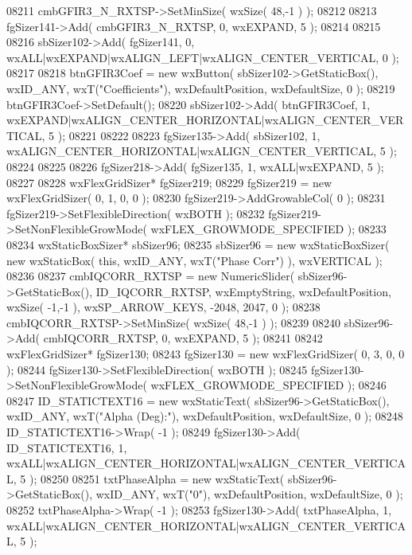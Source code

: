 \begin{DoxyCode}
08211     cmbGFIR3_N_RXTSP->SetMinSize( wxSize( 48,-1 ) );
08212     
08213     fgSizer141->Add( cmbGFIR3_N_RXTSP, 0, wxEXPAND, 5 );
08214     
08215     
08216     sbSizer102->Add( fgSizer141, 0, wxALL|wxEXPAND|wxALIGN\_LEFT|wxALIGN\_CENTER\_VERTICAL, 0 );
08217     
08218     btnGFIR3Coef = \textcolor{keyword}{new} wxButton( sbSizer102->GetStaticBox(), wxID\_ANY, wxT(\textcolor{stringliteral}{"Coefficients"}), 
      wxDefaultPosition, wxDefaultSize, 0 );
08219     btnGFIR3Coef->SetDefault(); 
08220     sbSizer102->Add( btnGFIR3Coef, 1, wxEXPAND|wxALIGN\_CENTER\_HORIZONTAL|wxALIGN\_CENTER\_VERTICAL, 5 );
08221     
08222     
08223     fgSizer135->Add( sbSizer102, 1, wxALIGN\_CENTER\_HORIZONTAL|wxALIGN\_CENTER\_VERTICAL, 5 );
08224     
08225     
08226     fgSizer218->Add( fgSizer135, 1, wxALL|wxEXPAND, 5 );
08227     
08228     wxFlexGridSizer* fgSizer219;
08229     fgSizer219 = \textcolor{keyword}{new} wxFlexGridSizer( 0, 1, 0, 0 );
08230     fgSizer219->AddGrowableCol( 0 );
08231     fgSizer219->SetFlexibleDirection( wxBOTH );
08232     fgSizer219->SetNonFlexibleGrowMode( wxFLEX\_GROWMODE\_SPECIFIED );
08233     
08234     wxStaticBoxSizer* sbSizer96;
08235     sbSizer96 = \textcolor{keyword}{new} wxStaticBoxSizer( \textcolor{keyword}{new} wxStaticBox( \textcolor{keyword}{this}, wxID\_ANY, wxT(\textcolor{stringliteral}{"Phase Corr"}) ), wxVERTICAL );
08236     
08237     cmbIQCORR_RXTSP = \textcolor{keyword}{new} NumericSlider( sbSizer96->GetStaticBox(), 
      ID_IQCORR_RXTSP, wxEmptyString, wxDefaultPosition, wxSize( -1,-1 ), wxSP\_ARROW\_KEYS, -2048, 2047, 0 );
08238     cmbIQCORR_RXTSP->SetMinSize( wxSize( 48,-1 ) );
08239     
08240     sbSizer96->Add( cmbIQCORR_RXTSP, 0, wxEXPAND, 5 );
08241     
08242     wxFlexGridSizer* fgSizer130;
08243     fgSizer130 = \textcolor{keyword}{new} wxFlexGridSizer( 0, 3, 0, 0 );
08244     fgSizer130->SetFlexibleDirection( wxBOTH );
08245     fgSizer130->SetNonFlexibleGrowMode( wxFLEX\_GROWMODE\_SPECIFIED );
08246     
08247     ID_STATICTEXT16 = \textcolor{keyword}{new} wxStaticText( sbSizer96->GetStaticBox(), wxID\_ANY, wxT(\textcolor{stringliteral}{"Alpha (Deg):"}), 
      wxDefaultPosition, wxDefaultSize, 0 );
08248     ID_STATICTEXT16->Wrap( -1 );
08249     fgSizer130->Add( ID_STATICTEXT16, 1, wxALL|wxALIGN\_CENTER\_HORIZONTAL|wxALIGN\_CENTER\_VERTICAL, 5 );
08250     
08251     txtPhaseAlpha = \textcolor{keyword}{new} wxStaticText( sbSizer96->GetStaticBox(), wxID\_ANY, wxT(\textcolor{stringliteral}{"0"}), wxDefaultPosition, 
      wxDefaultSize, 0 );
08252     txtPhaseAlpha->Wrap( -1 );
08253     fgSizer130->Add( txtPhaseAlpha, 1, wxALL|wxALIGN\_CENTER\_HORIZONTAL|wxALIGN\_CENTER\_VERTICAL, 5 );

\end{DoxyCode}
